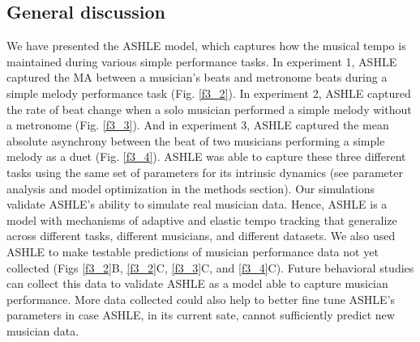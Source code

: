 \documentclass{report}
\begin{document}
\subsection{General discussion}
We have presented the ASHLE model, which captures how the musical tempo is maintained during various simple performance tasks. In experiment 1, ASHLE captured the MA between a musician's beats and metronome beats during a simple melody performance task (Fig.{} \ref{f3_2}). In experiment 2, ASHLE captured the rate of beat change when a solo musician performed a simple melody without a metronome (Fig.{} \ref{f3_3}). And in experiment 3, ASHLE captured the mean absolute asynchrony between the beat of two musicians performing a simple melody as a duet (Fig.{} \ref{f3_4}). ASHLE was able to capture these three different tasks using the same set of parameters for its intrinsic dynamics (see parameter analysis and model optimization in the methods section). Our simulations validate ASHLE's ability to simulate real musician data. Hence, ASHLE is a model with mechanisms of adaptive and elastic tempo tracking that generalize across different tasks, different musicians, and different datasets. We also used ASHLE to make testable predictions of musician performance data not yet collected (Figs \ref{f3_2}B, \ref{f3_2}C, \ref{f3_3}C, and \ref{f3_4}C). Future behavioral studies can collect this data to validate ASHLE as a model able to capture musician performance. More data collected could also help to better fine tune ASHLE's parameters in case ASHLE, in its current sate, cannot sufficiently predict new musician data.
\end{document}
